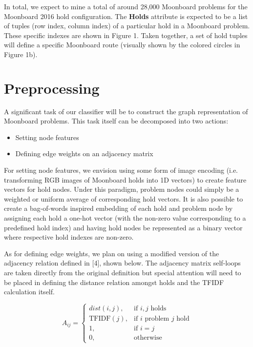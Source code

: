 \documentclass{article}
\begin{document}
In total, we expect to mine a total of around 28,000 Moonboard problems for the Moonboard 2016 hold configuration. The \textbf{Holds} attribute is expected to be a list of tuples (row index, column index) of a particular hold in a Moonboard problem. These specific indexes are shown in Figure 1. Taken together, a set of hold tuples will define a specific Moonboard route (visually shown by the colored circles in Figure 1b).

\section{Preprocessing}
A significant task of our classifier will be to construct the graph representation of Moonboard problems. This task itself can be decomposed into two actions: 

\begin{itemize}
\setlength\itemsep{0.1em}
\item Setting node features
\item Defining edge weights on an adjacency matrix
\end{itemize}

For setting node features, we envision using some form of image encoding (i.e. transforming RGB images of Moonboard holds into 1D vectors) to create feature vectors for hold nodes. Under this paradigm, problem nodes could simply be a weighted or uniform average of corresponding hold vectors. It is also possible to create a bag-of-words inspired embedding of each hold and problem node by assigning each hold a one-hot vector (with the non-zero value corresponding to a predefined hold index) and having hold nodes be represented as a binary vector where respective hold indexes are non-zero. 

As for defining edge weights, we plan on using a modified version of the adjacency relation defined in [4], shown below. The adjacency matrix self-loops are taken directly from the original definition but special attention will need to be placed in defining the distance relation amongst holds and the TFIDF calculation itself.

\[
    A_{ij}= 
\begin{cases}
    dist(i, j), & \text{if } i, j \text{ holds} \\
    \text{TFIDF}(j), & \text{if } i \text{ problem } j \text{ hold} \\
    1, & \text{if } i=j \\
    0, & \text{otherwise}
\end{cases}
\]
\end{document}
